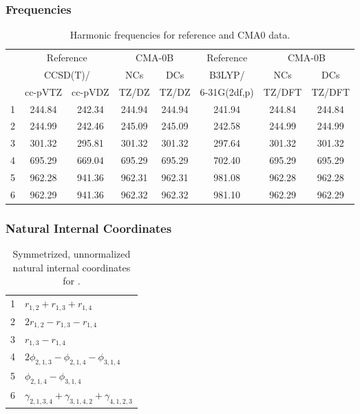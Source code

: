\documentclass[10pt,oneside]{article}
\begin{document}
\clearpage

\subsubsection*{Frequencies}
\begin{table}[h!]
\centering
\caption{Harmonic frequencies for reference and CMA0 data.}
\begin{tabular}{cccccccc}
\toprule
{} & \multicolumn{2}{c}{Reference} & \multicolumn{2}{c}{CMA-0B} &    Reference & \multicolumn{2}{c}{CMA-0B} \\
{} & \multicolumn{2}{c}{CCSD(T)/} &    NCs &    DCs &       B3LYP/ &    NCs &    DCs \\
{} &   cc-pVTZ & cc-pVDZ &  TZ/DZ &  TZ/DZ & 6-31G(2df,p) & TZ/DFT & TZ/DFT \\
\midrule
1 &    244.84 &  242.34 & 244.94 & 244.94 &       241.94 & 244.84 & 244.84 \\
2 &    244.99 &  242.46 & 245.09 & 245.09 &       242.58 & 244.99 & 244.99 \\
3 &    301.32 &  295.81 & 301.32 & 301.32 &       297.64 & 301.32 & 301.32 \\
4 &    695.29 &  669.04 & 695.29 & 695.29 &       702.40 & 695.29 & 695.29 \\
5 &    962.28 &  941.36 & 962.31 & 962.31 &       981.08 & 962.28 & 962.28 \\
6 &    962.29 &  941.36 & 962.32 & 962.32 &       981.10 & 962.29 & 962.29 \\
\bottomrule
\end{tabular}
\end{table}

\clearpage

\subsubsection*{Natural Internal Coordinates}
\begin{table}[h!]
\centering
\caption{Symmetrized, unnormalized natural internal coordinates for .}
\small
\begin{tabular}{ll}
  1   & $r_{1,2} + r_{1,3} + r_{1,4}$ \\
  2   & $2r_{1,2} - r_{1,3} - r_{1,4}$ \\
  3   & $r_{1,3} - r_{1,4}$ \\
  4   & $2\phi_{2,1,3} - \phi_{2,1,4} - \phi_{3,1,4}$ \\
  5   & $\phi_{2,1,4} - \phi_{3,1,4}$ \\
  6   & $\gamma_{2,1,3,4} + \gamma_{3,1,4,2} + \gamma_{4,1,2,3}$ \\
\end{tabular}
\end{table}
\end{document}
